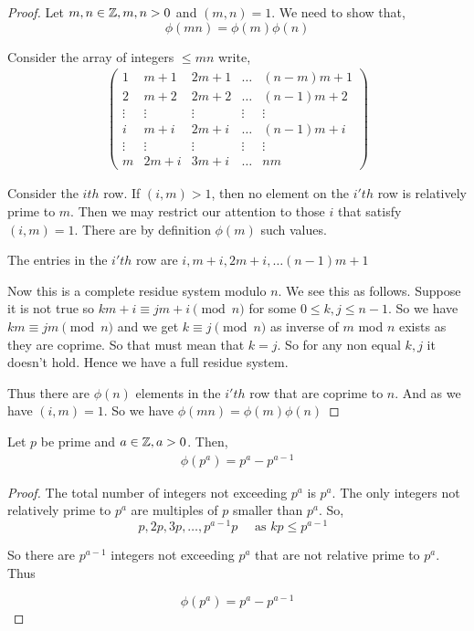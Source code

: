 \begin{proof}
	Let $m, n \in \mathbb{Z}, m, n > 0$ and $(m,n) = 1$. We need to show that,
	$$
		\phi(mn) = \phi(m)\phi(n)
	$$

	Consider the array of integers $\le mn$ write,
	\begin{align*}
		\begin{pmatrix}
			1 & m + 1 & 2m + 1 & \dots & (n - m)m + 1\\
			2 & m + 2 & 2m + 2  &\dots & (n - 1)m + 2\\
			\vdots & \vdots & \vdots & \vdots & \vdots \\
			i & m + i & 2m + i & \dots & (n - 1) m + i\\
			\vdots & \vdots &\vdots &\vdots & \vdots \\
			m & 2m + i & 3m + i & \dots & nm
		\end{pmatrix}
	\end{align*}

	Consider the $ith$ row. If $(i, m) > 1$, then no element on the $i'th$ row is relatively prime to $m$. Then we may restrict our attention to those $i$ that satisfy $(i, m) = 1$. There are by definition $\phi(m)$ such values.

	\vspace{1em}
	
	The entries in the $i'th$ row are $i, m + i, 2m + i, \dots (n - 1)m + 1$
	\vspace{1em}
	

	Now this is a complete residue system modulo $n$. We see this as follows. Suppose it is not true so $km + i \equiv jm + i \pmod n$ for some $0 \le k,j \le n - 1$. So we have $km \equiv jm \pmod n$ and we get $k \equiv j \pmod n$ as inverse of $m$ mod $n$ exists as they are coprime. So that must mean that $k = j$. So for any non equal $k, j$ it doesn't hold. Hence we have a full residue system.
	\vspace{1em}
	

	Thus there are $\phi(n)$ elements in the $i'th$ row that are coprime to $n$. And as we have $(i, m) = 1$. So we have $\phi(mn) = \phi(m) \phi(n)$
\end{proof}

\begin{theorem}
	Let $p$ be prime and $a \in \mathbb{Z} , a> 0$. Then,
	\begin{align*}
		 \phi(p^{a}) = p^{a} - p^{a - 1}
	\end{align*}
\end{theorem}				
\begin{proof}
	The total number of integers not exceeding $p^{ a}$ is $p^{a}$. The only integers not relatively prime to $p^{a}$ are multiples of $p$ smaller than $p^{a}$. So,
	$$
		p, 2p, 3p, \dots, p^{a - 1}p \quad \text{ as $kp \le p^{a - 1}$ }
	$$

	
	So there are $p^{a - 1}$ integers not exceeding $p^{a}$ that are not relative prime to $p^{a}$. Thus 

	$$\phi(p^{a}) = p^{a} - p^{a - 1}$$
\end{proof}				

